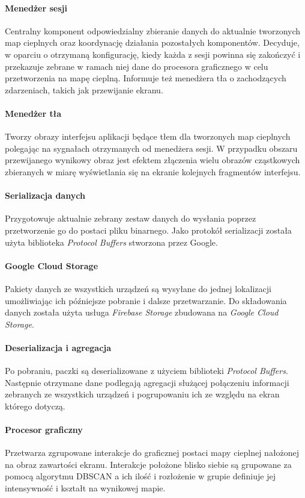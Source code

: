 \paragraph{Menedżer sesji} 
\label{par:rs_session_manager}
Centralny komponent odpowiedzialny zbieranie danych do aktualnie tworzonych map cieplnych oraz koordynację działania pozostałych komponentów. Decyduje, w oparciu o otrzymaną konfigurację, kiedy każda z sesji powinna się zakończyć i przekazuje zebrane w ramach niej dane do  procesora graficznego w celu przetworzenia na mapę cieplną. Informuje też menedżera tła o zachodzących zdarzeniach, takich jak przewijanie ekranu.

\paragraph{Menedżer tła} 
\label{par:rs_bg_manager}
Tworzy obrazy interfejsu aplikacji będące tłem dla tworzonych map cieplnych polegając na sygnałach otrzymanych od menedżera sesji. W przypadku obszaru przewijanego wynikowy obraz jest efektem złączenia wielu  obrazów cząstkowych zbieranych w miarę wyświetlania się na ekranie kolejnych fragmentów interfejsu.

\paragraph{Serializacja danych}
Przygotowuje aktualnie zebrany zestaw danych do wysłania poprzez przetworzenie go do postaci pliku binarnego. Jako protokół serializacji została użyta biblioteka {\it Protocol Buffers} stworzona przez Google.

\paragraph{Google Cloud Storage}
Pakiety danych ze wszystkich urządzeń są wysyłane do jednej lokalizacji umożliwiając ich późniejsze pobranie i dalsze przetwarzanie. Do składowania danych została użyta usługa {\it Firebase Storage} zbudowana na {\it Google Cloud Storage}.

\paragraph{Deserializacja i agregacja}
Po pobraniu, paczki są deserializowane z użyciem biblioteki {\it Protocol Buffers}. Następnie otrzymane dane podlegają agregacji służącej połączeniu informacji zebranych ze wszystkich urządzeń i pogrupowaniu ich ze względu na ekran którego dotyczą.

\paragraph{Procesor graficzny} 
\label{par:rs_graphical_processor}
Przetwarza zgrupowane interakcje do graficznej postaci mapy cieplnej nałożonej na obraz zawartości ekranu. Interakcje położone blisko siebie są grupowane za pomocą algorytmu DBSCAN \cite{DBSCAN_Wiki} a ich ilość i rozłożenie w grupie definiuje jej intensywność i kształt na wynikowej mapie.
